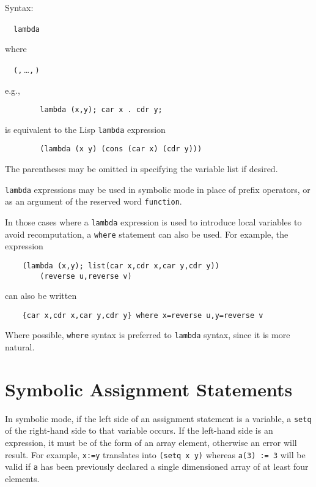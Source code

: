 Syntax:
\begin{syntax}
  \ \BNFprod\
    \texttt{lambda } 
\end{syntax}
 where
\begin{syntax}
  \ \BNFprod\ \texttt{(}\texttt{,}\,\dots\texttt{,}\,\texttt{)}
\end{syntax}
e.g.,
\begin{verbatim}
        lambda (x,y); car x . cdr y;
\end{verbatim}
is equivalent to the Lisp \texttt{lambda} expression
\begin{verbatim}
        (lambda (x y) (cons (car x) (cdr y)))
\end{verbatim}
The parentheses may be omitted in specifying the variable list if desired.

\texttt{lambda} expressions may be used in symbolic mode in place of prefix
operators, or as an argument of the reserved word \hypertarget{reserved:FUNCTION}{\texttt{function}}.

In those cases where a \texttt{lambda} expression is used to introduce local
variables to avoid recomputation, a \texttt{where} statement can also be
used.  For example, the expression
\begin{verbatim}
    (lambda (x,y); list(car x,cdr x,car y,cdr y))
        (reverse u,reverse v)
\end{verbatim}
can also be written
\begin{verbatim}
    {car x,cdr x,car y,cdr y} where x=reverse u,y=reverse v
\end{verbatim}
Where possible, \texttt{where} syntax is preferred to \texttt{lambda} syntax,
since it is more natural.

\section{Symbolic Assignment Statements}
\index{Symbolic mode!assignment}
\hypertarget{command:SETQ}{}

In symbolic mode, if the left side of an assignment statement is a
variable, a \texttt{setq} of the right-hand side to that variable occurs.  If
the left-hand side is an expression, it must be of the form of an array
element, otherwise an error will result.  For example, \texttt{x:=y}
translates into \texttt{(setq x y)} whereas \texttt{a(3) := 3} will be valid if
\texttt{a} has been previously declared a single dimensioned array of at
least four elements.

